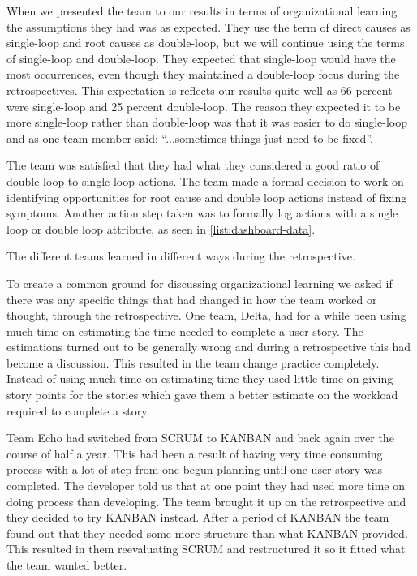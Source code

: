 When we presented the team to our results in terms of organizational learning the assumptions they had was as expected. They use the term of direct causes as single-loop and root causes as double-loop, but we will continue using the terms of single-loop and double-loop. They expected that single-loop would have the most occurrences, even though they maintained a double-loop focus during the retrospectives. This expectation is reflects our results quite well as 66 percent were single-loop and 25 percent double-loop. The reason they expected it to be more single-loop rather than double-loop was that it was easier to do single-loop and as one team member said: ``...sometimes things just need to be fixed''. 

The team was satisfied that they had what they considered a good ratio of double loop to single loop actions. The team made a formal decision to work on identifying opportunities for root cause and double loop actions instead of fixing symptoms. Another action step taken was to formally log actions with a single loop or double loop attribute, as seen in \autoref{list:dashboard-data}.

\label{sub:organizational_learning}
The different teams learned in different ways during the retrospective.

\label{question-11}
To create a common ground for discussing organizational learning we asked if there was any specific things that had changed in how the team worked or thought, through the retrospective. One team, Delta, had for a while been using much time on estimating the time needed to complete a user story. The estimations turned out to be generally wrong and during a retrospective this had become a discussion. This resulted in the team change practice completely. Instead of using much time on estimating time they used little time on giving story points for the stories which gave them a better estimate on the workload required to complete a story. 

Team Echo had switched from SCRUM to KANBAN and back again over the course of half a year. This had been a result of having very time consuming process with a lot of step from one begun planning until one user story was completed. The developer told us that at one point they had used more time on doing process than developing. The team brought it up on the retrospective and they decided to try KANBAN instead. After a period of KANBAN the team found out that they needed some more structure than what KANBAN provided. This resulted in them reevaluating SCRUM and restructured it so it fitted what the team wanted better. 

